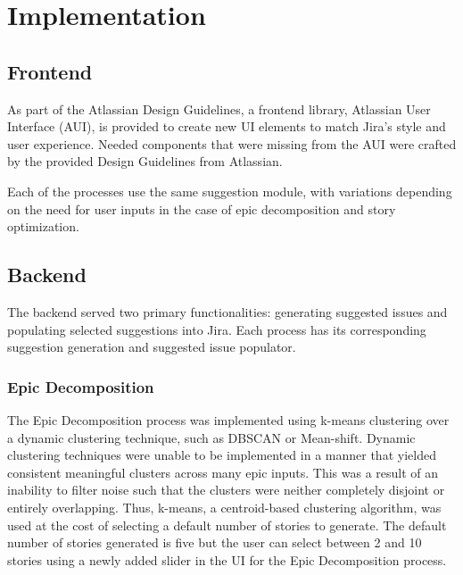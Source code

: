 \section{Implementation}

\subsection{Frontend}

As part of the Atlassian Design Guidelines, a frontend library, Atlassian User Interface (AUI), is provided to create new UI elements to match Jira’s style and user experience. Needed components that were missing from the AUI were crafted by the provided Design Guidelines from Atlassian. 

Each of the processes use the same suggestion module, with variations depending on the need for user inputs in the case of epic decomposition and story optimization. 


\subsection{Backend}

The backend served two primary functionalities: generating suggested issues and populating selected suggestions into Jira. Each process has its corresponding suggestion generation and suggested issue populator.

\subsubsection{Epic Decomposition}
The Epic Decomposition process was implemented using k-means clustering over a dynamic clustering technique, such as DBSCAN or Mean-shift. Dynamic clustering techniques were unable to be implemented in a manner that yielded consistent meaningful clusters across many epic inputs. This was a result of an inability to filter noise such that the clusters were neither completely disjoint or entirely overlapping. Thus, k-means, a centroid-based clustering algorithm, was used at the cost of selecting a default number of stories to generate. The default number of stories generated is five but the user can select between 2 and 10 stories using a newly added slider in the UI for the Epic Decomposition process.

